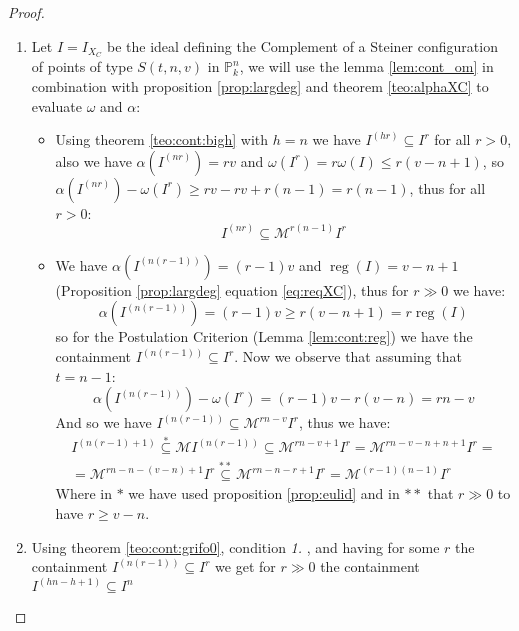\documentclass[notitlepage, a4]{book}
\theoremstyle{plain}
\theoremstyle{remark}
\theoremstyle{definition}
\newcommand{\PP}{\mathbb{P}}
\newcommand{\MM}{\mathcal{M}}
\newcommand{\cont}[2]{ I^{(#1)} \subseteq I^{#2}}
\newcommand{\mcont}[3]{ I^{(#1)} \subseteq \MM^{#2} I^{#3}}
\DeclareMathOperator{\reg}{reg}
\newcounter{que}
\begin{document}
\begin{proof}
\begin{enumerate}
\item Let $ I = I_{X_C}$ be the ideal defining the Complement of a Steiner configuration of points of type $ S(t,n,v) $ in $ \PP_k^n $, we will use the lemma \ref{lem:cont_om} in combination with proposition \ref{prop:largdeg} and theorem \ref{teo:alphaXC} to evaluate $\omega$ and $\alpha$:
	\begin{itemize}
	\item Using theorem \ref{teo:cont:bigh} with $ h=n $ we have $ \cont{hr}{r} $ for all $ r>0 $, also we have $ \alpha(I^{(nr)}) = rv $ and $ \omega(I^r)=r\omega(I)  \leq r(v-n+1) $, so $  \alpha(I^{(nr)}) - \omega(I^r) \geq rv - rv + r(n-1) = r(n-1) $, thus for all $ r>0 $:
	\[ 
	\mcont{nr}{r(n-1)}{r}
	\]
	\item We have $\alpha(I^{(n(r-1))}) = (r-1)v $ and $ \reg(I) = v-n+1 $ (Proposition \ref{prop:largdeg} equation \ref{eq:reqXC}), thus for $ r \gg 0 $ we have:
	\[ \alpha(I^{(n(r-1))}) = (r-1)v \geq r(v-n+1) = r \reg(I)\]
	so for the Postulation Criterion (Lemma \ref{lem:cont:reg}) we have the containment $ \cont{n(r-1)}{r} $. Now we observe that assuming that $ t=n-1 $:
\begin{equation} \label{eq:alpha?}
	\alpha(I^{(n(r-1))}) - \omega (I^r) = (r-1)v - r(v-n)=rn -v
\end{equation}
 And so we have $ \mcont{n(r-1)}{rn-v}{r} $, thus we have:
 \begin{multline*}
 I^{(n(r-1)+1)} \stackrel{*}{\subseteq} \mathcal{M} I^{(n(r-1))} \subseteq \mathcal{M}^{r n-v+1} I^{r} =\mathcal{M}^{r n-v-n+n+1} I^{r}=\\
 =\mathcal{M}^{r n-n-(v-n)+1} I^{r} 
  \stackrel{**}{\subseteq} \mathcal{M}^{r n-n-r+1} I^{r}=\mathcal{M}^{(r-1)(n-1)} I^{r}
 \end{multline*}
 Where in $ \ast $ we have used proposition \ref{prop:eulid} and in $ \ast \ast $ that $ r \gg 0 $ to have $ r \geq v-n $.
%	
	
	\end{itemize}
\item Using theorem \ref{teo:cont:grifo0}, condition \textit{1.} , and having for some $ r $ the containment $ \cont{n(r-1)}{r} $ we get for $ r \gg 0 $ the containment $ \cont{hn - h +1}{n} $
\end{enumerate}
\end{proof}
\end{document}
